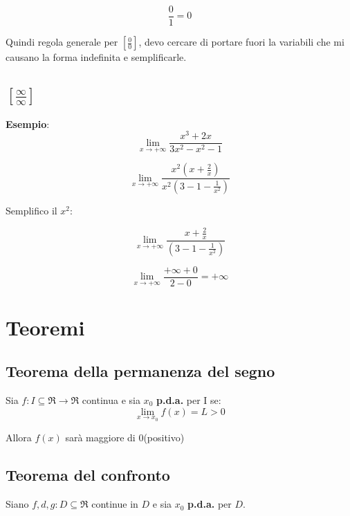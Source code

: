 \begin{equation*}
    \frac{0}{1} = 0
\end{equation*}


Quindi regola generale per $[\frac{0}{0}]$, devo cercare di portare fuori la variabili che mi causano la forma indefinita
e semplificarle.

\subsection{$[\frac{\infty}{\infty}]$}

\textbf{Esempio}:
\begin{equation*}
    \lim_{x \rightarrow + \infty} \frac{x^3 + 2x}{3x^2 - x^2 -1}
\end{equation*}

\begin{equation*}
    \lim_{x \rightarrow + \infty} \frac{x^2(x + \frac{2}{x})}
    {x^2(3 - 1 -\frac{1}{x^2})}
\end{equation*}

Semplifico il $x^2$:

\begin{equation*}
    \lim_{x \rightarrow + \infty} \frac{x + \frac{2}{x}}
    {(3 - 1 -\frac{1}{x^2})}
\end{equation*}

\begin{equation*}
    \lim_{x \rightarrow + \infty} \frac{+\infty + 0}
    {2 - 0} = +\infty
\end{equation*}

\section{Teoremi}
\subsection{Teorema della permanenza del segno}

Sia $f: I \subseteq \Re \rightarrow \Re$ continua e sia $x_0$ \textbf{p.d.a.} per I se:
\begin{equation*}
    \lim_{x \rightarrow x_0} f(x) = L > 0
\end{equation*}

Allora $f(x)$ sarà maggiore di 0(positivo)

\subsection{Teorema del confronto}
Siano $f, d, g : D \subseteq \Re$ continue in $D$ e sia $x_0$ \textbf{p.d.a.} per $D$.

